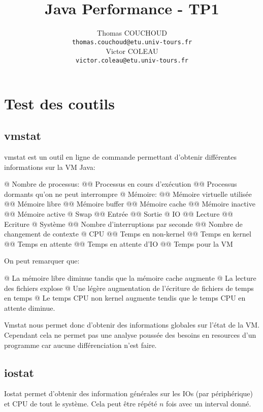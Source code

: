 \documentclass{report}
\title{Java Performance - TP1}
\author{Thomas COUCHOUD\\\texttt{thomas.couchoud@etu.univ-tours.fr}\\Victor COLEAU\\\texttt{victor.coleau@etu.univ-tours.fr}}
\begin{document}
	\mccTitle
	
	\chapter{Test des coutils}
		\section{vmstat}
			vmstat est un outil en ligne de commande permettant d'obtenir différentes informations sur la VM Java:
			\begin{easylist}[itemize]
				@ Nombre de processus:
				@@ Processus en cours d'exécution
				@@ Processus dormants qu'on ne peut interrompre
				@ Mémoire:
				@@ Mémoire virtuelle utilisée
				@@ Mémoire libre
				@@ Mémoire buffer
				@@ Mémoire cache
				@@ Mémoire inactive
				@@ Mémoire active
				@ Swap
				@@ Entrée
				@@ Sortie
				@ IO
				@@ Lecture
				@@ Ecriture
				@ Système
				@@ Nombre d'interruptions par seconde
				@@ Nombre de changement de contexte
				@ CPU
				@@ Temps en non-kernel
				@@ Temps en kernel
				@@ Temps en attente
				@@ Temps en attente d'IO
				@@ Temps pour la VM
			\end{easylist}
			
			
			On peut remarquer que:
			\begin{easylist}[itemize]
				@ La mémoire libre diminue tandis que la mémoire cache augmente
				@ La lecture des fichiers explose
				@ Une légère augmentation de l'écriture de fichiers de temps en temps
				@ Le temps CPU non kernel augmente tendis que le temps CPU en attente diminue.	
			\end{easylist}

			Vmstat nous permet donc d'obtenir des informations globales sur l'état de la VM.
			Cependant cela ne permet pas une analyse poussée des besoins en resources d'un programme car aucune différenciation n'est faire.
			
		\section{iostat}
			Iostat permet d'obtenir des information générales sur les IOs (par périphérique) et CPU de tout le système.
			Cela peut être répété $n$ fois avec un interval donné.
			
			
\end{document}
